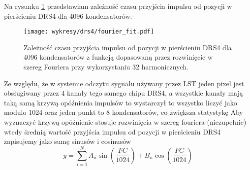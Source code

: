 \documentclass[a4paper,11pt,twoside]{article}
\begin{document}
Na rysunku \ref{fig:fourier_fit_4096} przedstawiam zależność czasu przyjścia impulsu od pozycji w pierścieniu DRS4 dla 4096 kondensatorów.
\begin{figure}[H] 
\centering
\texttt{[image: wykresy/drs4/fourier\_fit.pdf]}
\caption{Zależność czasu przyjścia impulsu od pozycji w pierścieniu DRS4 dla 4096 kondensatorów z funkcją dopasowaną przez rozwinięcie w szereg Fouriera przy wykorzystaniu 32 harmonicznych.}
\label{fig:fourier_fit_4096}
\end{figure}
 Ze względu, że w systemie odczytu sygnału używany przez LST jeden pixel jest obsługiwany przez 4 kanały tego samego chipu DRS4, a wszystkie kanały mają taką samą krzywą opóźnienia impulsów to wystarczył to wszystko liczyć jako modulo 1024 oraz jeden punkt to 8 kondensatorów, co zwiększa statystykę
Aby wyznaczyć krzywą opóźnienie stosuje rozwinięcia w szereg fouriera (niezupełnie) wtedy
średnią wartość przyjścia impulsu od pozycji w pierścieniu DRS4 zapisujemy jako sumę sinusów i cosinusów
\begin{equation}
y = \sum_{i=1}^{N} A_n \sin \left( \frac{FC}{1024} \right) + B_n \cos \left( \frac{FC}{1024} \right)
\end{equation}
\end{document}

